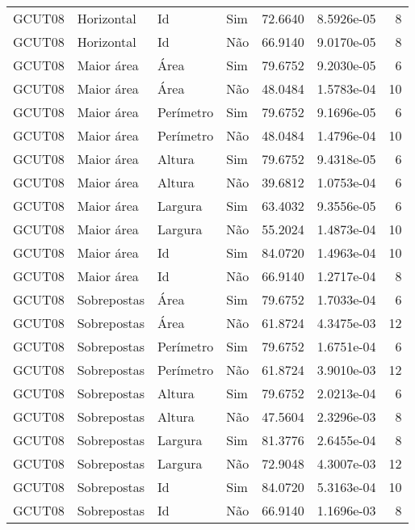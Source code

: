\begin{tabular}{llllrrr}
    GCUT08    & Horizontal  & Id        & Sim         & 72.6640      & 8.5926e-05 & 8        \\
    GCUT08    & Horizontal  & Id        & Não         & 66.9140      & 9.0170e-05 & 8        \\
    GCUT08    & Maior área  & Área      & Sim         & 79.6752      & 9.2030e-05 & 6        \\
    GCUT08    & Maior área  & Área      & Não         & 48.0484      & 1.5783e-04 & 10       \\
    GCUT08    & Maior área  & Perímetro & Sim         & 79.6752      & 9.1696e-05 & 6        \\
    GCUT08    & Maior área  & Perímetro & Não         & 48.0484      & 1.4796e-04 & 10       \\
    GCUT08    & Maior área  & Altura    & Sim         & 79.6752      & 9.4318e-05 & 6        \\
    GCUT08    & Maior área  & Altura    & Não         & 39.6812      & 1.0753e-04 & 6        \\
    GCUT08    & Maior área  & Largura   & Sim         & 63.4032      & 9.3556e-05 & 6        \\
    GCUT08    & Maior área  & Largura   & Não         & 55.2024      & 1.4873e-04 & 10       \\
    GCUT08    & Maior área  & Id        & Sim         & 84.0720      & 1.4963e-04 & 10       \\
    GCUT08    & Maior área  & Id        & Não         & 66.9140      & 1.2717e-04 & 8        \\
    GCUT08    & Sobrepostas & Área      & Sim         & 79.6752      & 1.7033e-04 & 6        \\
    GCUT08    & Sobrepostas & Área      & Não         & 61.8724      & 4.3475e-03 & 12       \\
    GCUT08    & Sobrepostas & Perímetro & Sim         & 79.6752      & 1.6751e-04 & 6        \\
    GCUT08    & Sobrepostas & Perímetro & Não         & 61.8724      & 3.9010e-03 & 12       \\
    GCUT08    & Sobrepostas & Altura    & Sim         & 79.6752      & 2.0213e-04 & 6        \\
    GCUT08    & Sobrepostas & Altura    & Não         & 47.5604      & 2.3296e-03 & 8        \\
    GCUT08    & Sobrepostas & Largura   & Sim         & 81.3776      & 2.6455e-04 & 8        \\
    GCUT08    & Sobrepostas & Largura   & Não         & 72.9048      & 4.3007e-03 & 12       \\
    GCUT08    & Sobrepostas & Id        & Sim         & 84.0720      & 5.3163e-04 & 10       \\
    GCUT08    & Sobrepostas & Id        & Não         & 66.9140      & 1.1696e-03 & 8        \\
    \hline
\end{tabular}